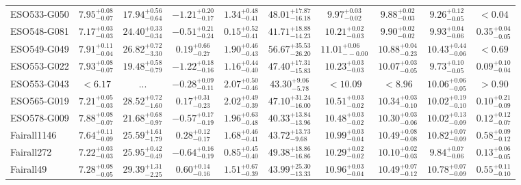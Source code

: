 \documentclass[onecolumn]{mn2e}
\begin{document}
\begin{landscape}
{\begin{center}
\begin{longtable}{lccccccccc}
ESO533-G050 & $7.95_{-0.07}^{+0.08}$ & $17.94_{-0.64}^{+0.56}$ & $-1.21_{-0.17}^{+0.20}$ & $1.34_{-0.41}^{+0.48}$ &$48.01_{-16.18}^{+17.87}$ & $9.97_{-0.02}^{+0.03}$ & $9.88_{-0.03}^{+0.02}$ & $9.26_{-0.05}^{+0.12}$ & $<0.04$ \\
ESO548-G081 & $7.17_{-0.03}^{+0.03}$ & $24.40_{-0.34}^{+0.33}$ & $-0.51_{-0.24}^{+0.21}$ & $0.15_{-0.41}^{+0.52}$ &$41.71_{-14.23}^{+18.88}$ & $10.21_{-0.03}^{+0.02}$ & $9.90_{-0.02}^{+0.02}$ & $9.93_{-0.06}^{+0.04}$ & $0.35_{-0.05}^{+0.04}$ \\
ESO549-G049 & $7.91_{-0.04}^{+0.11}$ & $26.82_{-3.30}^{+0.72}$ & $0.19_{-0.27}^{+0.66}$ & $1.90_{-0.43}^{+0.46}$ &$56.67_{-26.20}^{+35.53}$ & $11.01_{--0.00}^{+0.06}$ & $10.88_{-0.23}^{+0.04}$ & $10.43_{-0.06}^{+0.44}$ & $<0.69$ \\
ESO553-G022 & $7.93_{-0.07}^{+0.08}$ & $19.48_{-0.79}^{+0.58}$ & $-1.22_{-0.16}^{+0.18}$ & $1.16_{-0.40}^{+0.44}$ &$47.40_{-15.83}^{+17.31}$ & $10.23_{-0.03}^{+0.03}$ & $10.07_{-0.05}^{+0.03}$ & $9.73_{-0.05}^{+0.10}$ & $0.09_{-0.04}^{+0.10}$ \\
ESO553-G043 & $<6.17$ & ... & $-0.28_{-0.11}^{+0.09}$ & $2.07_{-0.46}^{+0.50}$ &$43.30_{-5.78}^{+9.06}$ & $<10.09$ & $<8.96$ & $10.06_{-0.05}^{+0.06}$ & $>0.90$ \\
ESO565-G019 & $7.21_{-0.03}^{+0.05}$ & $28.52_{-1.60}^{+0.72}$ & $0.17_{-0.23}^{+0.31}$ & $2.02_{-0.39}^{+0.49}$ &$47.10_{-16.00}^{+31.24}$ & $10.51_{-0.02}^{+0.03}$ & $10.34_{-0.10}^{+0.03}$ & $10.02_{-0.10}^{+0.19}$ & $0.10_{-0.09}^{+0.21}$ \\
ESO578-G009 & $7.88_{-0.07}^{+0.08}$ & $21.68_{-0.97}^{+0.68}$ & $-0.57_{-0.19}^{+0.17}$ & $1.96_{-0.48}^{+0.63}$ &$40.33_{-13.96}^{+13.84}$ & $10.48_{-0.02}^{+0.03}$ & $10.30_{-0.06}^{+0.03}$ & $10.02_{-0.09}^{+0.13}$ & $0.12_{-0.07}^{+0.12}$ \\
Fairall1146 & $7.64_{-0.09}^{+0.11}$ & $25.59_{-1.79}^{+1.61}$ & $0.28_{-0.17}^{+0.12}$ & $1.68_{-0.41}^{+0.46}$ &$43.72_{-9.68}^{+13.73}$ & $10.99_{-0.04}^{+0.03}$ & $10.49_{-0.08}^{+0.08}$ & $10.82_{-0.09}^{+0.07}$ & $0.58_{-0.12}^{+0.09}$ \\
Fairall272 & $7.22_{-0.03}^{+0.03}$ & $25.95_{-0.49}^{+0.42}$ & $-0.64_{-0.19}^{+0.16}$ & $0.85_{-0.40}^{+0.45}$ &$49.38_{-16.86}^{+18.86}$ & $10.29_{-0.02}^{+0.02}$ & $10.10_{-0.03}^{+0.02}$ & $9.84_{-0.06}^{+0.07}$ & $0.13_{-0.05}^{+0.06}$ \\
Fairall49 & $7.28_{-0.05}^{+0.08}$ & $29.39_{-2.25}^{+1.31}$ & $0.60_{-0.16}^{+0.14}$ & $1.51_{-0.39}^{+0.67}$ &$43.99_{-13.33}^{+25.30}$ & $10.96_{-0.04}^{+0.03}$ & $10.49_{-0.12}^{+0.07}$ & $10.78_{-0.09}^{+0.07}$ & $0.55_{-0.10}^{+0.11}$ \\

\end{longtable}
\end{center}}
\end{landscape}
\end{document}
